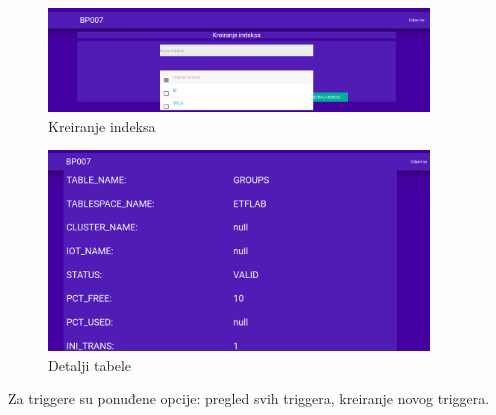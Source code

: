 \documentclass[12pt, a4paper]{report}
\theoremstyle{definition}
\begin{document}
\begin{figure}[H]
	\begin{center} 
		\includegraphics[width=0.9\textwidth]{a15.png}
	\end{center}
	\caption{Kreiranje indeksa}
\end{figure}

\begin{figure}[H]
	\begin{center} 
		\includegraphics[width=0.9\textwidth]{a8.png}
	\end{center}
	\caption{Detalji tabele}
\end{figure}

\newpage
Za triggere su ponuđene opcije: pregled svih triggera, kreiranje novog triggera.
\end{document}
